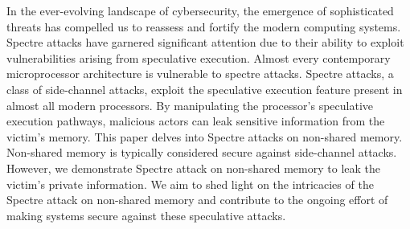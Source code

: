 \documentclass{main}
\begin{document}
In the ever-evolving landscape of cybersecurity, the emergence of sophisticated threats has compelled us to reassess and fortify the modern computing systems. Spectre attacks have garnered significant attention due to their ability to exploit vulnerabilities arising from speculative execution. Almost every contemporary microprocessor architecture is vulnerable to spectre attacks. Spectre attacks, a class of side-channel attacks, exploit the speculative execution feature present in almost all modern processors. By manipulating the processor's speculative execution pathways, malicious actors can leak sensitive information from the victim's memory. This paper delves into Spectre attacks on non-shared memory. Non-shared memory is typically considered secure against side-channel attacks. However, we demonstrate Spectre attack on non-shared memory to leak the victim's private information. We aim to shed light on the intricacies of the Spectre attack on non-shared memory and contribute to the ongoing effort of making systems secure against these speculative attacks.
\end{document}
